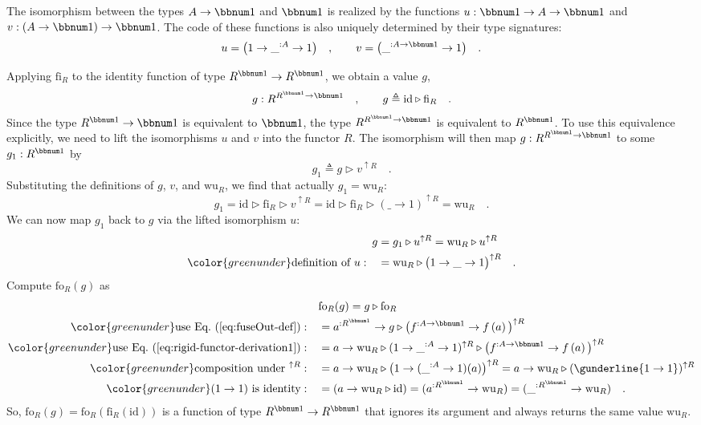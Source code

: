 The isomorphism between the types $A\rightarrow\bbnum 1$ and $\bbnum 1$
is realized by the functions $u:\bbnum 1\rightarrow A\rightarrow\bbnum 1$
and $v:\left(A\rightarrow\bbnum 1\right)\rightarrow\bbnum 1$. The
code of these functions is also uniquely determined by their type
signatures:
\[
u=\big(1\rightarrow\_^{:A}\rightarrow1\big)\quad,\quad\quad v=\big(\_^{:A\rightarrow\bbnum 1}\rightarrow1\big)\quad.
\]

Applying $\text{fi}_{R}$ to the identity function of type $R^{\bbnum 1}\rightarrow R^{\bbnum 1}$,
we obtain a value $g$, 
\[
g:R^{R^{\bbnum 1}\rightarrow\bbnum 1}\quad,\quad\quad g\triangleq\text{id}\triangleright\text{fi}_{R}\quad.
\]
Since the type $R^{\bbnum 1}\rightarrow\bbnum 1$ is equivalent to
$\bbnum 1$, the type $R^{R^{\bbnum 1}\rightarrow\bbnum 1}$ is equivalent
to $R^{\bbnum 1}$. To use this equivalence explicitly, we need to
lift the isomorphisms $u$ and $v$ into the functor $R$. The isomorphism
will then map $g:R^{R^{\bbnum 1}\rightarrow\bbnum 1}$ to some $g_{1}:R^{\bbnum 1}$
by
\[
g_{1}\triangleq g\triangleright v^{\uparrow R}\quad.
\]
Substituting the definitions of $g$, $v$, and $\text{wu}_{R}$,
we find that actually $g_{1}=\text{wu}_{R}$:
\[
g_{1}=\text{id}\triangleright\text{fi}_{R}\triangleright v^{\uparrow R}=\text{id}\triangleright\text{fi}_{R}\triangleright(\_\rightarrow1)^{\uparrow R}=\text{wu}_{R}\quad.
\]
We can now map $g_{1}$ back to $g$ via the lifted isomorphism $u$:
\begin{align}
g & =g_{1}\triangleright u^{\uparrow R}=\text{wu}_{R}\triangleright u^{\uparrow R}\nonumber \\
{\color{greenunder}\text{definition of }u:}\quad & =\text{wu}_{R}\triangleright\big(1\rightarrow\_\rightarrow1\big)^{\uparrow R}\quad.\label{eq:rigid-functor-derivation1}
\end{align}
Compute $\text{fo}_{R}(g)$ as
\begin{align*}
 & \text{fo}_{R}(g)=g\triangleright\text{fo}_{R}\\
{\color{greenunder}\text{use Eq.~(\ref{eq:fuseOut-def})}:}\quad & =a^{:R^{\bbnum 1}}\rightarrow g\triangleright\big(f^{:A\rightarrow\bbnum 1}\rightarrow f\left(a\right)\big)^{\uparrow R}\\
{\color{greenunder}\text{use Eq.~(\ref{eq:rigid-functor-derivation1})}:}\quad & =a\rightarrow\text{wu}_{R}\triangleright(1\rightarrow\_^{:A}\rightarrow1)^{\uparrow R}\triangleright\big(f^{:A\rightarrow\bbnum 1}\rightarrow f\left(a\right)\big)^{\uparrow R}\\
{\color{greenunder}\text{composition under }^{\uparrow R}:}\quad & =a\rightarrow\text{wu}_{R}\triangleright\big(1\rightarrow(\_^{:A}\rightarrow1)(a)\big)^{\uparrow R}=a\rightarrow\text{wu}_{R}\triangleright(\gunderline{1\rightarrow1})^{\uparrow R}\\
{\color{greenunder}(1\rightarrow1)\text{ is identity}:}\quad & =(a\rightarrow\text{wu}_{R}\triangleright\text{id})=(a^{:R^{\bbnum 1}}\rightarrow\text{wu}_{R})=(\_^{:R^{\bbnum 1}}\rightarrow\text{wu}_{R})\quad.
\end{align*}
So, $\text{fo}_{R}(g)=\text{fo}_{R}(\text{fi}_{R}(\text{id}))$ is
a function of type $R^{\bbnum 1}\rightarrow R^{\bbnum 1}$ that ignores
its argument and always returns the same value $\text{wu}_{R}$.


